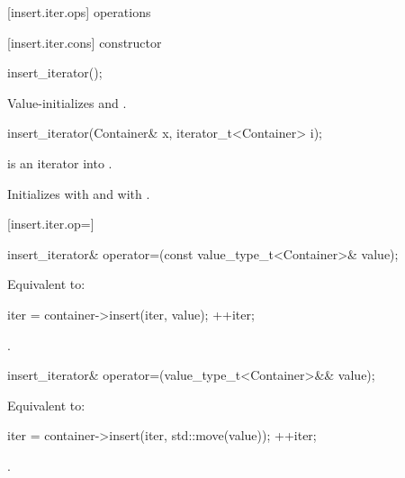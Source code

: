 [insert.iter.ops]{ operations}

[insert.iter.cons]{ constructor}

%
\begin{itemdecl}
insert_iterator();
\end{itemdecl}

\begin{itemdescr}
\pnum
\effects
Value-initializes
 and .
\end{itemdescr}

%
\begin{itemdecl}
insert_iterator(Container& x, iterator_t<Container> i);
\end{itemdecl}

\begin{itemdescr}
\pnum
\requires
{} is an iterator into .

\pnum
\effects
Initializes
with  and
with .
\end{itemdescr}

[insert.iter.op=]{}

%
\begin{itemdecl}
insert_iterator&
  operator=(const value_type_t<Container>& value);
\end{itemdecl}

\begin{itemdescr}
\pnum
\effects Equivalent to:
\begin{codeblock}
iter = container->insert(iter, value);
++iter;
\end{codeblock}

\pnum
\returns
{}.
\end{itemdescr}

%
\begin{itemdecl}
insert_iterator&
  operator=(value_type_t<Container>&& value);
\end{itemdecl}

\begin{itemdescr}
\pnum
\effects Equivalent to:
\begin{codeblock}
iter = container->insert(iter, std::move(value));
++iter;
\end{codeblock}

\pnum
\returns
{}.
\end{itemdescr}


